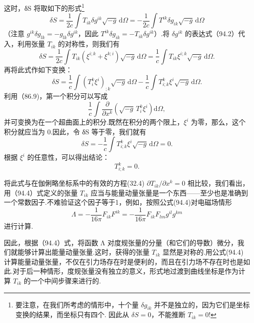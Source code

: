 这时，δS 将取如下的形式\footnote{要注意，在我们所考虑的情形中，十个量 $\delta g_{ik}$ 并不是独立的，因为它们是坐标变换的结果，而坐标只有四个. 因此从 $\delta S=0$，不能推断 $T_{ik}=0$!}
\begin{equation}
  \delta S=\frac{1}{2c}\int T_{ik}\delta g^{ik}\sqrt{-g}\,\mathrm{d}\varOmega
  =-\frac{1}{2c}\int T^{ik}\delta g_{ik}\sqrt{-g}\,\mathrm{d}\varOmega
\end{equation}
（注意 $g^{ik}\delta g_{lk}=-g_{lk}\delta g^{ik}$，因此 $T^{ik}\delta g_{ik}=-T_{ik}\delta g^{ik}$）.将 $\delta g^{ik}$ 的表达式（94.2）代入，利用张量 $T_{ik}$ 的对称性，则我们有
\begin{equation*}
  \delta S=\frac{1}{2c}\int T_{ik}\left(\xi^{i;k}+\xi^{k;i}\right)
  \sqrt{-g}\,\mathrm{d}\varOmega
  =\frac{1}{c}\int T_{ik}\xi^{i;k}\sqrt{-g}\,\mathrm{d}\varOmega.
\end{equation*}
再将此式作如下变换：
\begin{equation}
  \delta S=\frac{1}{c}\int\left(T_i^k\xi^i\right)_{;k}\sqrt{-g}\,\mathrm{d}\varOmega
  -\frac{1}{c}\int T^k_{i;k}\xi^i\sqrt{-g}\,\mathrm{d}\varOmega.
\end{equation}
利用（86.9)，第一个积分可以写成
\begin{equation*}
  \frac{1}{c}\int\frac{\partial}{\partial x^k}
  \left(\sqrt{-g}\,T_i^k\xi^i\right)\mathrm{d}\varOmega,
\end{equation*}
并可变换为在一个超曲面上的积分.既然在积分的两个限上，$\xi^i$ 为零，那么，这个积分就应当为 0.因此，令 δS 等于零，我们就有
\begin{equation*}
  \delta S=-\frac{1}{c}\int T^k_{i;k}\xi^i\sqrt{-g}\,\mathrm{d}\varOmega=0.
\end{equation*}
根据 $\xi^i$ 的任意性，可以得出结论：
\begin{equation}
  T^k_{i;k}=0.
\end{equation}

将此式与在伽俐略坐标系中的有效的方程(32.4) $\partial T_{ik}/\partial x^k=0$ 相比较，我们看出，用（94.4）式定义的张量 $T_{ik}$ 应当与能量动量张量是一个东西——至少也是准确到一个常数因子.不难验证这个因子等于1，例如，按照公式(94.4)对电磁场情形
\begin{equation*}
  \varLambda=-\frac{1}{16\pi}F_{ik}F^{ik}
  =-\frac{1}{16\pi}F_{ik}F_{lm}g^{il}g^{km}
\end{equation*}
进行计算.

因此，根据（94.4）式，将函数 Λ 对度规张量的分量（和它们的导数）微分，我们就能够计算出能量动量张量.这时，获得的张量 $T_{ik}$ 显然是对称的.用公式(94.4)计算能量动量张量，不仅在引力场存在时是便利的，而且在引力场不存在时也是如此.对于后一种情形，度规张量没有独立的意义，形式地过渡到曲线坐标是作为计算 $T_{ik}$ 的一个中间步骤来进行的.


